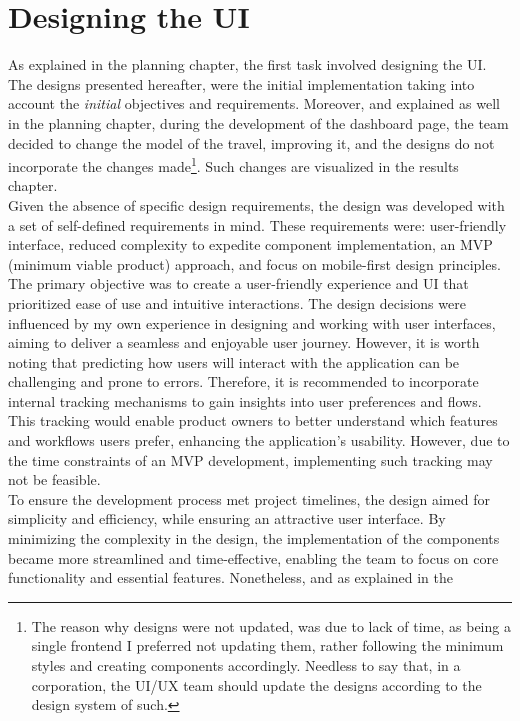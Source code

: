 \documentclass[./memory.tex]{subfiles}
\begin{document}
\section{Designing the UI}
As explained in the planning chapter, the first task involved designing the UI.
The designs presented hereafter, were the initial implementation taking into
account the \emph{initial} objectives and requirements. Moreover, and explained
as well in the planning chapter, during the development of the dashboard page,
the team decided to change the model of the travel, improving it, and the
designs do not incorporate the changes made\footnote{The reason why designs were
	not updated, was due to lack of time, as being a single frontend I preferred not
	updating them, rather following the minimum styles and creating components
	accordingly. Needless to say that, in a corporation, the UI/UX team should
	update the designs according to the design system of such.}. Such changes
are visualized in the results chapter.
\\[8pt]
Given the absence of specific design requirements, the design was developed with
a set of self-defined requirements in mind. These requirements were:
user-friendly interface, reduced complexity to expedite component
implementation, an MVP (minimum viable product) approach, and focus on
mobile-first design principles.
\\
The primary objective was to create a user-friendly experience and UI that
prioritized ease of use and intuitive interactions. The design decisions were
influenced by my own experience in designing and working with user interfaces,
aiming to deliver a seamless and enjoyable user journey. However, it is worth
noting that predicting how users will interact with the application can be
challenging and prone to errors. Therefore, it is recommended to incorporate
internal tracking mechanisms to gain insights into user preferences and flows.
This tracking would enable product owners to better understand which features
and workflows users prefer, enhancing the application's usability. However, due
to the time constraints of an MVP development, implementing such tracking may
not be feasible.
\\
To ensure the development process met project timelines, the design aimed for
simplicity and efficiency, while ensuring an attractive user interface. By
minimizing the complexity in the design, the implementation of the components
became more streamlined and time-effective, enabling the team to focus on core
functionality and essential features. Nonetheless, and as explained in the
\end{document}
